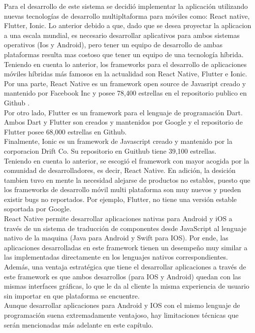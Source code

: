
Para el desarrollo de este sistema se decidió implementar la aplicación utilizando nuevas tecnologías de desarrollo multipltaforma para móviles como: React native, Flutter, Ionic. Lo anterior debido a que, dado que se desea proyectar la aplicacion a una escala mundial, es necesario desarrollar aplicativos para ambos sistemas operativos (Ios y Android), pero tener un equipo de desarrollo de ambas plataformas resulta mas costoso que tener un equipo de una tecnología híbrida.
\vspace{0.5cm}\\
Teniendo en cuenta lo anterior, los frameworks para el desarrollo de aplicaciones móviles híbridas más famosos en la actualidad son React Native, Flutter e Ionic.
\vspace{0.5cm}\\
Por una parte, React Native es un framework open source de Javasript creado y mantenido por Facebook Inc y posee 78,400 estrellas en el repositorio publico en Github \cite{mobilestadistics}. 
\vspace{0.5cm}\\
Por otro lado, Flutter es un framework para el lenguaje de programación Dart. Ambos Dart y Flutter son creados y mantenidos por Google y el repositorio de Flutter posee 68,000 estrellas en Github\cite{mobilestadistics}.
\vspace{0.5cm}\\
Finalmente, Ionic es un framework de Javascript creado y mantenido por la corporacion Drift Co. Su repositorio en Guithub tiene 39,100 estrellas.
\vspace{0.5cm}\\
Teniendo en cuenta lo anterior, se escogió el framework con mayor acogida por la comunidad de desarrolladores, es decir, React Native. En adición, la desición tambien tuvo en mente la necesidad alejarse de productos no estables, puesto que los frameworks de desarrollo móvil multi plataforma son muy nuevos y pueden existir bugs no reportados. Por ejemplo, Flutter, no tiene una versión estable soportada por Google.
\vspace{0.5cm}\\
React Native permite desarrollar aplicaciones nativas para Android y iOS a través de un sistema de traducción de componentes desde JavaScript al lenguaje nativo de la maquina (Java para Android y Swift para IOS). Por ende, las aplicaciones desarrolladas en este framework tienen un desempeño muy similar a las implementadas directamente en los lenguajes nativos correspondientes.
\vspace{0.5cm}\\
Además, una ventaja estratégica que tiene el desarrollar aplicaciones a través de este framework es que ambos desarrollos (para IOS y Android) quedan con las mismas interfaces gráficas, lo que le da al cliente la misma experiencia de usuario sin importar en que plataforma se encuentre.
\vspace{0.5cm}\\
Aunque desarrollar aplicaciones para Android y IOS con el mismo lenguaje de programación suena extremadamente ventajoso, hay limitaciones técnicas que serán mencionadas más adelante en este capítulo.


